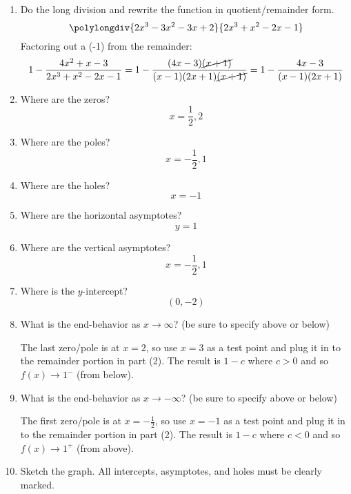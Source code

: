 \documentclass[letterpaper,12pt,fleqn]{article}
\begin{document}
\begin{enumerate}
\item Do the long division and rewrite the function in quotient/remainder form.
  \[\polylongdiv{2x^3-3x^2-3x+2}{2x^3+x^2-2x-1}\]
  Factoring out a (-1) from the remainder:
  \[1-\frac{4x^2+x-3}{2x^3+x^2-2x-1}=1-\frac{(4x-3)\cancel{(x+1)}}{(x-1)(2x+1)\cancel{(x+1)}}=
  1-\frac{4x-3}{(x-1)(2x+1)}\]
\item Where are the zeros?
  \[x=\frac{1}{2},2\]
\item Where are the poles?
  \[x=-\frac{1}{2},1\]
\item Where are the holes?
  \[x=-1\]
\item Where are the horizontal asymptotes?
  \[y=1\]
\item Where are the vertical asymptotes?
  \[x=-\frac{1}{2},1\]
\item Where is the \(y\)-intercept?
  \[(0,-2)\]
\item What is the end-behavior as \(x\to\infty\)? (be sure to specify above or below)

  The last zero/pole is at \(x=2\), so use \(x=3\) as a test point and plug it in to the remainder portion in
  part (2).  The result is \(1-c\) where \(c>0\) and so \(f(x)\to1^{-}\) (from below).

\item What is the end-behavior as \(x\to-\infty\)? (be sure to specify above or below)

  The first zero/pole is at \(x=-\frac{1}{2}\), so use \(x=-1\) as a test point and plug it in to the remainder
  portion in part (2).  The result is \(1-c\) where \(c<0\) and so \(f(x)\to1^{+}\) (from above).
  
\item Sketch the graph.  All intercepts, asymptotes, and holes must be clearly marked.

  \newcommand{\eq}{(2*(\x)^3-3*(\x)^2-3*(\x)+2)/(2*(\x)^3+(\x)^2-2*(\x)-1)}

\end{enumerate}
\end{document}
